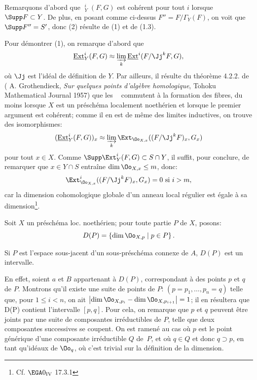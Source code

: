 Remarquons d'abord que $\mathop{\underline{\mathrm{Ext}}}\nolimits^i_Y (F, G)$ est coh\'erent pour tout $i$ lorsque $\Supp F \subset Y$. De plus, en posant comme ci-dessus $F'' = F/\Gamma_Y(F)$, on voit que $\Supp F'' = S'$, donc (2) r\'esulte de (1) et de (1.3).

Pour d\'emontrer (1), on remarque d'abord que
\[
\mathop{\underline{\mathrm{Ext}}}\nolimits^i_Y (F, G) \approx \varinjlim_{k} \mathop{\underline{\mathrm{Ext}}}\nolimits^i (F/\Jj^k F, G),
\]
o\`u $\Jj$ est l'id\'eal de d\'efinition de $Y$. Par ailleurs, il
r\'esulte du th\'eor\`eme 4.2.2. de ( A. Grothendieck,
\textit{Sur quelques points d'algèbre homologique}, Tohoku
Mathematical Journal 1957) que les $\mathop{\underline{\mathrm{Ext}}}\nolimits$ commutent \`a
la formation des fibres, du moins lorsque $X$ est un pr\'esch\'ema
localement noeth\'erien et lorsque le premier argument est coh\'erent;
comme il en est de m\^eme des limites inductives, on trouve des
isomorphismes:
\[
(\mathop{\underline{\mathrm{Ext}}}\nolimits^i_Y (F, G))_x \approx \varinjlim_{k} \Ext_{\Oo_{X, x}} ((F/\Jj^k F)_x, G_x)
\]
pour tout $x \in X$. Comme $\Supp \Ext^i_Y (F, G) \subset S \cap Y$, il suffit, pour conclure, de remarquer que $x \in Y \cap S$ entra\^ine $\dim \Oo_{X, x} \leq m$, donc:
\[
\Ext^i_{\Oo_{X, x}} ((F/\Jj^k F)_x, G_x) = 0 \text { si } i > m,
\]
car la dimension cohomologique globale d'un anneau local r\'egulier est \'egale \`a sa dimension\footnote{Cf. $\EGA 0_{\textup{IV}}$ 17.3.1}.

Soit $X$ un pr\'esch\'ema loc. noeth\'erien; pour toute partie $P$ de $X$, posons:
\[
D(P) = \left\{ \dim \Oo_{X, p} \mid p \in P \right\}.
\]

\begin{lemme}\label{VII.2.2}
Si $P$ est l'espace sous-jacent d'un sous-pr\'esch\'ema connexe de $A$, $D(P)$ est un intervalle.
\end{lemme}

En effet, soient $a$ et $B$ appartenant \`a $D(P)$, correspondant \`a des points $p$ et $q$ de $P$. Montrons qu'il existe une suite de points de $P$: $(p = p_1, \dots, p_n = q)$ telle que, pour $1 \leq i < n $, on ait $\left| \dim \Oo_{X, p_i} - \dim \Oo_{X, p_{i+1}} \right| = 1$; il en r\'esultera que D(P) contient l'intervalle $[p, q]$. Pour cela, on remarque que $p$ et $q$ peuvent \^etre joints par une suite de composantes irr\'eductibles de $P$, telle que deux composantes successives se coupent. On est ramen\'e au cas o\`u $p$ est le point g\'en\'erique d'une composante irr\'eductible $Q$ de~$P$, et o\`u $q \in Q$ et donc $q \supset p$, en tant qu'id\'eaux de $\Oo_q$, o\`u c'est trivial sur la d\'efinition de la dimension.

